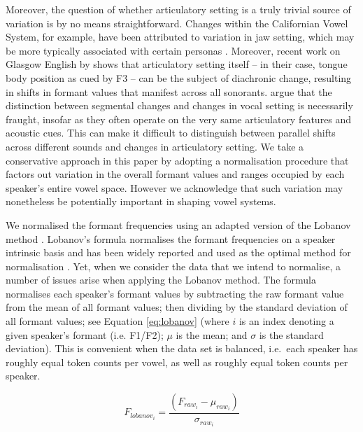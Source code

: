\documentclass[review]{elsarticle} %
\begin{document}
Moreover, the question of whether articulatory setting is a truly trivial source of variation is by no means straightforward.  Changes within the Californian Vowel System, for example, have been attributed to variation in jaw setting, which may be more typically associated with certain personas \citep{pratt2017jaw}.
Moreover, recent work on Glasgow English by \citet{soskuthyandstuartsmith20} shows that articulatory setting itself -- in their case, tongue body position as cued by F3 -- can be the subject of diachronic change, resulting in shifts in formant values that manifest across all sonorants. \citet{soskuthyandstuartsmith20} argue that the distinction between segmental changes and changes in vocal setting is necessarily fraught, insofar as they often operate on the very same articulatory features and acoustic cues. This can make it difficult to distinguish between parallel shifts across different sounds and changes in articulatory setting. We take a conservative approach in this paper by adopting a normalisation procedure that factors out variation in the overall formant values and ranges occupied by each speaker’s entire vowel space.  However we acknowledge that such variation may nonetheless be potentially important in shaping vowel systems.

We normalised the formant frequencies using an adapted version of the Lobanov method \citep{lobanov1971classification}. Lobanov's formula normalises the formant frequencies on a speaker intrinsic basis and has been widely reported and used as the optimal method for normalisation \citep{adank2004comparison}. Yet, when we consider the data that we intend to normalise, a number of issues arise when applying the Lobanov method. The formula normalises each speaker's formant values by subtracting the raw formant value from the mean of all formant values; then dividing by the standard deviation of all formant values; see Equation \ref{eq:lobanov} (where $i$ is an index denoting a given speaker's formant (i.e. F1/F2); $\mu$ is the mean; and $\sigma$ is the standard deviation). This is convenient when the data set is balanced, i.e.\ each speaker has roughly equal token counts per vowel, as well as roughly equal token counts per speaker.

\begin{equation}
F_{lobanov_i} = \frac{(F_{raw_i}-\mu_{raw_i})}{\sigma_{raw_i}}
\label{eq:lobanov}
\end{equation}
\end{document}
